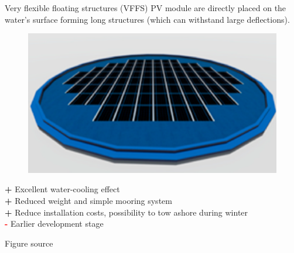 \documentclass[aspectratio=169, 12pt]{beamer}
\begin{document}
\begin{frame}{Very flexible floating structures (VFFS)}{\insertsubsection}
  PV module are directly placed on the water's surface forming long structures (which can withstand large deflections).

  \begin{figure}
    \centering
    \includegraphics[width=0.3\columnwidth]{figure/vffs.png}
  \end{figure}

  \textcolor{NTNUgreen}{\textbf{+}} Excellent water-cooling effect\\
  \textcolor{NTNUgreen}{\textbf{+}} Reduced weight and simple mooring system\\
  \textcolor{NTNUgreen}{\textbf{+}} Reduce installation costs, possibility to tow ashore during winter\\
  \textcolor{red}{\textbf{-}} Earlier development stage

  {\tiny Figure source \cite{vffs_figure}}
\end{frame}
\end{document}
